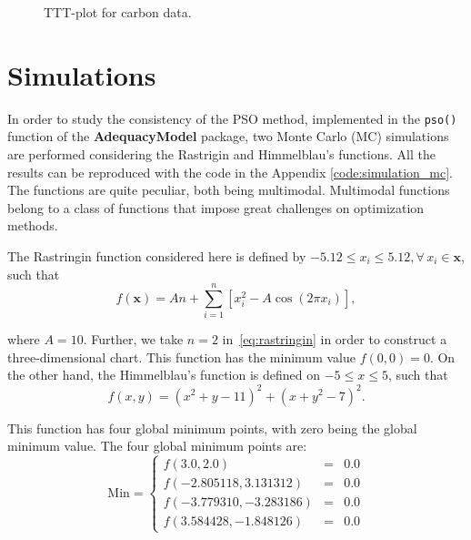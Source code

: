 \documentclass[10pt,letterpaper]{article}
\begin{document}
\begin{figure}[H]
\centering
\caption{TTT-plot for carbon data.}
\label{tttplot}
\end{figure}

\section{Simulations}

In order to study the consistency of the PSO method, implemented in the \texttt{pso()} function of the \textbf{AdequacyModel} package, two Monte Carlo (MC) simulations are performed con\-si\-der\-ing the Rastrigin and Himmelblau's functions. All the results can be reproduced with the code in the Appendix \ref{code:simulation_mc}. The functions are quite peculiar, both being multimodal. Mul\-ti\-mo\-dal functions belong to a class of functions that impose great challenges on optimization methods.
	
The Rastringin function considered here is defined by $-5.12 \leq x_i \leq 5.12, \forall\, x_i \in \bm{x}$, such that
\begin{equation}
f(\bm{x}) = An + \sum_{i = 1}^{n} [x_i^2 - A\cos(2\pi x_i) ],
\label{eq:rastringin}
\end{equation}

where $A = 10$. Further, we take $n=2$ in~\eqref{eq:rastringin} in order to construct a three-dimensional chart. This function has the minimum value $ f(0, 0) = 0 $. On the other hand, the Himmelblau's function is defined on $ -5 \leq x \leq 5 $, such that
\begin{equation}
f(x, y) = (x^2 + y -11)^2 + (x + y^2 - 7)^2.
\label{eq:himmelblaus}
\end{equation}

This function has four global minimum points, with zero being the global minimum value. The four global minimum points are:
$$
\mathrm{Min} = \left \{
\begin{array}{rcc}
f(3.0, 2.0) & = & 0.0 \\
f(-2.805118, 3.131312) & = & 0.0 \\
f(-3.779310, -3.283186) & = & 0.0 \\
f(3.584428, -1.848126) & = & 0.0
\end{array} 
\right.
$$
\end{document}
